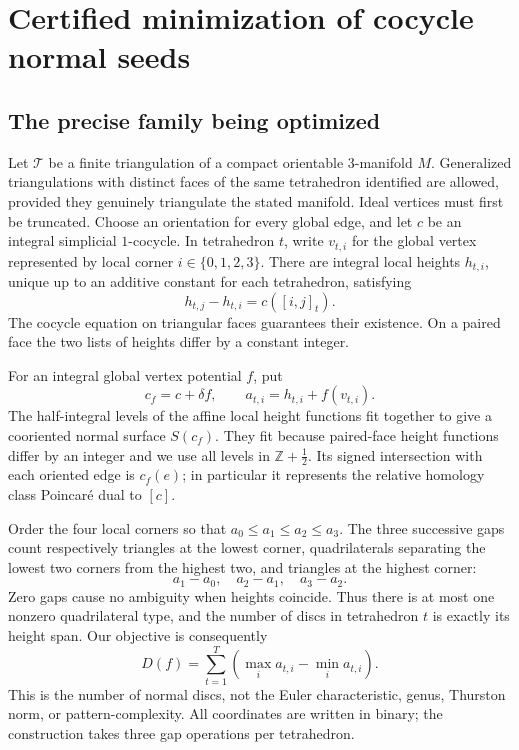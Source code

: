 
\section{Certified minimization of cocycle normal seeds}
\label{sec:cocycle}

\subsection{The precise family being optimized}

Let $\mathcal T$ be a finite triangulation of a compact orientable
$3$-manifold $M$. Generalized triangulations with distinct faces of the
same tetrahedron identified are allowed, provided they genuinely triangulate
the stated manifold. Ideal vertices must first be truncated. Choose an
orientation for every global edge, and let $c$ be an integral simplicial
$1$-cocycle. In tetrahedron $t$, write $v_{t,i}$ for the global vertex
represented by local corner $i\in\{0,1,2,3\}$. There are integral local heights
$h_{t,i}$, unique up to an additive constant for each tetrahedron, satisfying
\[
 h_{t,j}-h_{t,i}=c([i,j]_t).
\]
The cocycle equation on triangular faces guarantees their existence.
On a paired face the two lists of heights differ by a constant integer.

For an integral global vertex potential $f$, put
\[
 c_f=c+\delta f,\qquad a_{t,i}=h_{t,i}+f(v_{t,i}).
\]
The half-integral levels of the affine local height functions fit together
to give a cooriented normal surface $S(c_f)$. They fit because paired-face
height functions differ by an integer and we use all levels in
$\mathbb Z+\tfrac12$. Its signed intersection with each oriented edge is
$c_f(e)$; in particular it represents the relative homology class
Poincar\'e dual to $[c]$.

Order the four local corners so that
$a_0\leq a_1\leq a_2\leq a_3$. The three successive gaps count respectively
triangles at the lowest corner, quadrilaterals separating the lowest two
corners from the highest two, and triangles at the highest corner:
\[
 a_1-a_0,\quad a_2-a_1,\quad a_3-a_2.
\]
Zero gaps cause no ambiguity when heights coincide. Thus there is at most
one nonzero quadrilateral type, and the number of discs in tetrahedron $t$ is
exactly its height span. Our objective is consequently
\[
 D(f)=\sum_{t=1}^T\left(\max_i a_{t,i}-\min_i a_{t,i}\right).
 \tag{CS1}
\]
This is the number of normal discs, not the Euler characteristic, genus,
Thurston norm, or pattern-complexity. All coordinates are written in binary;
the construction takes three gap operations per tetrahedron.

